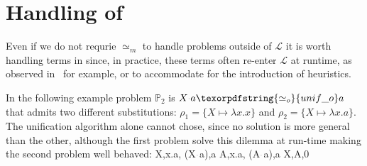 \documentclass[sigconf,natbib=false,review]{acmart}
\newcommand{\appsep}{\ensuremath{\textcolor{lightgray}{\cdot}}}
\newcommand{\UnifRel}{\ensuremath{\simeq}}
\newcommand{\nUnifRel}{\ensuremath{\not\simeq}}
\newcommand{\Uo}{\texorpdfstring{\ensuremath{\UnifRel_o}\xspace}{unif\_o}}
\newcommand{\nUo}{\ensuremath{\nUnifRel_o}\xspace}
\newcommand{\Ue}{\ensuremath{\UnifRel_m}\xspace}
\newcommand{\llambda}{\ensuremath{\mathcal{L}}\xspace}
\newcommand{\foUnifPb}{\ensuremath{\mathbb{P}}\xspace}
\begin{document}
\section{Handling of \notllambda}\label{sec:beta}

Even if we do not requrie \Ue to handle problems outside of \llambda it is
worth handling terms in \notllambda since, in practice, these terms often
re-enter \llambda at runtime, as observed in~\cite{Nadathur2001} for example,
or to accommodate for the introduction of heuristics.

In the following example problem $\foUnifPb_2$ is $X \appsep a \Uo a$  that
admits two different substitutions: $\rho_1 = \{X \mapsto \lambda x.x\}$
and $\rho_2 = \{X \mapsto \lambda x.a\}$. The unification algorithm alone
cannot chose, since no solution is more general than the other,
although the first problem solve this dilemma at run-time making the second
problem well behaved:
%
\printAlll
  {{{X,\lambda x.a},
    {(X\appsep a),a}}}
  {{{A,\lambda x.a},
    {(A\appsep a),a}}}
  {{{X,A,0}}}
  {{}}



\end{document}

